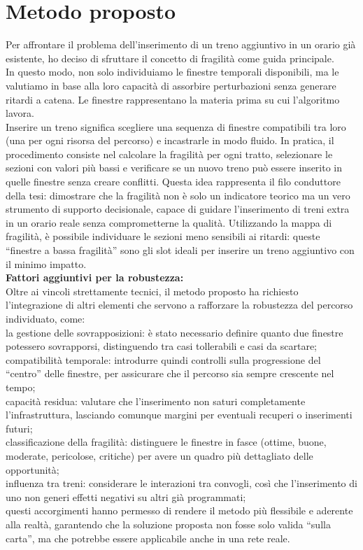 \documentclass{report}
\begin{document}
\section{Metodo proposto}
Per affrontare il problema dell’inserimento di un treno aggiuntivo in un orario già esistente, ho deciso di sfruttare il concetto di fragilità come guida principale. \\ In questo modo, non solo individuiamo le finestre temporali disponibili, ma le valutiamo in base alla loro capacità di assorbire perturbazioni senza generare ritardi a catena.
Le finestre rappresentano la materia prima su cui l’algoritmo lavora. \\ Inserire un treno significa scegliere una sequenza di finestre compatibili tra loro (una per ogni risorsa del percorso) e incastrarle in modo fluido.
In pratica, il procedimento consiste nel calcolare la fragilità per ogni tratto, selezionare le sezioni con valori più bassi e verificare se un nuovo treno può essere inserito in quelle finestre senza creare conflitti. Questa idea rappresenta il filo conduttore della tesi: dimostrare che la fragilità non è solo un indicatore teorico ma un vero strumento di supporto decisionale, capace di guidare l’inserimento di treni extra in un orario reale senza comprometterne la qualità.
 Utilizzando la mappa di fragilità, è possibile individuare le sezioni meno sensibili ai ritardi: queste “finestre a bassa fragilità” sono gli slot ideali per inserire un treno aggiuntivo con il minimo impatto.  \\ \textbf{Fattori aggiuntivi per la robustezza:}\\
Oltre ai vincoli strettamente tecnici, il metodo proposto ha richiesto l’integrazione di altri elementi che servono a rafforzare la robustezza del percorso individuato, come: \\ la gestione delle sovrapposizioni: è stato necessario definire quanto due finestre potessero sovrapporsi, distinguendo tra casi tollerabili e casi da scartare; \\ compatibilità temporale: introdurre quindi controlli sulla progressione del “centro” delle finestre, per assicurare che il percorso sia sempre crescente nel tempo;\\ capacità residua: valutare che l’inserimento non saturi completamente l’infrastruttura, lasciando comunque margini per eventuali recuperi o inserimenti futuri; \\ classificazione della fragilità: distinguere le finestre in fasce (ottime, buone, moderate, pericolose, critiche) per avere un quadro più dettagliato delle opportunità;\\ influenza tra treni: considerare le interazioni tra convogli, così che l’inserimento di uno non generi effetti negativi su altri già programmati;  \\ questi accorgimenti hanno permesso di rendere il metodo più flessibile e aderente alla realtà, garantendo che la soluzione proposta non fosse solo valida “sulla carta”, ma che potrebbe essere applicabile anche in una rete reale. \\
\end{document}
